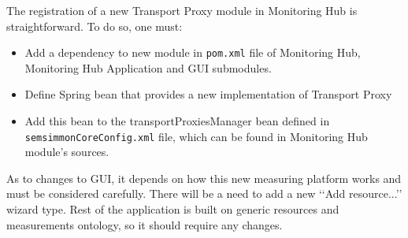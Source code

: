 The registration of a new Transport Proxy module in Monitoring Hub is straightforward. To do so, one must:

\begin{itemize}

\item Add a dependency to new module in \texttt{pom.xml} file of Monitoring Hub, Monitoring Hub Application and GUI submodules.

\item Define Spring bean that provides a new implementation of Transport Proxy

\item Add this bean to the transportProxiesManager bean defined in \texttt{semsimmonCoreConfig.xml} file, which can be found in Monitoring Hub module\rq{}s sources.

\end{itemize}

As to changes to GUI, it depends on how this new measuring platform works and must be considered carefully. There will be a need to add a new \lq\lq{}Add resource...\rq\rq{} wizard type. Rest of the application is built on generic resources and measurements ontology, so it should require any changes.

